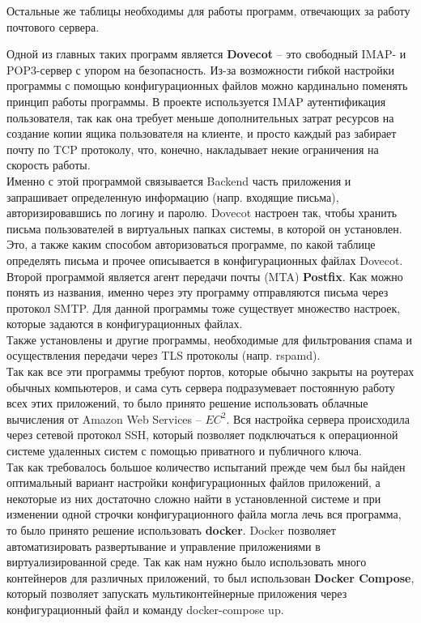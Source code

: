 \documentclass{article}
\begin{document}
Остальные же таблицы необходимы для работы программ, отвечающих за работу почтового сервера.

Одной из главных таких программ является \textbf{Dovecot} -- это свободный IMAP- и POP3-сервер с упором на безопасность. Из-за возможности гибкой настройки программы с помощью конфигурационных файлов
можно кардинально поменять принцип работы программы. В проекте используется IMAP аутентификация пользователя, так как она требует меньше дополнительных затрат ресурсов на создание копии ящика пользователя на клиенте, и просто каждый раз забирает почту по TCP протоколу, что, конечно, накладывает некие ограничения на скорость работы. \\

Именно с этой программой связывается Backend часть приложения и запрашивает определенную информацию (напр. входящие письма), авторизировавшись по логину и паролю. Dovecot настроен так, чтобы хранить письма пользователей в виртуальных папках системы, в которой он установлен. Это, а также каким способом авторизоваться программе, по какой таблице определять письма и прочее описывается в конфигурационных файлах Dovecot. \\

Второй программой является агент передачи почты (MTA) \textbf{Postfix}. Как можно понять из названия, именно через эту программу отправляются письма через протокол SMTP. Для данной программы тоже существует множество настроек, которые задаются в конфигурационных файлах. \\

Также установлены и другие программы, необходимые для фильтрования спама и осуществления передачи через TLS протоколы (напр. rspamd). \\

Так как все эти программы требуют портов, которые обычно закрыты на роутерах обычных компьютеров, и сама суть сервера подразумевает постоянную работу всех этих приложений, то было принято решение использовать облачные вычисления от Amazon Web Services -- $EC^2$. 
Вся настройка сервера происходила через сетевой протокол SSH, который позволяет подключаться к операционной системе удаленных систем с помощью приватного и публичного ключа.  \\

Так как требовалось большое количество испытаний прежде чем был бы найден оптимальный вариант настройки конфигурационных файлов приложений, а некоторые из них достаточно сложно найти в установленной системе и при изменении одной строчки конфигурационного файла могла лечь вся программа, то было принято решение использовать \textbf{docker}. Docker позволяет автоматизировать развертывание и управление приложениями в виртуализированной среде. Так как нам нужно было использовать много контейнеров для различных приложений, то был использован \textbf{Docker Compose}, который позволяет запускать мультиконтейнерные приложения через конфигурационный файл и команду docker-compose up. \\
\end{document}
